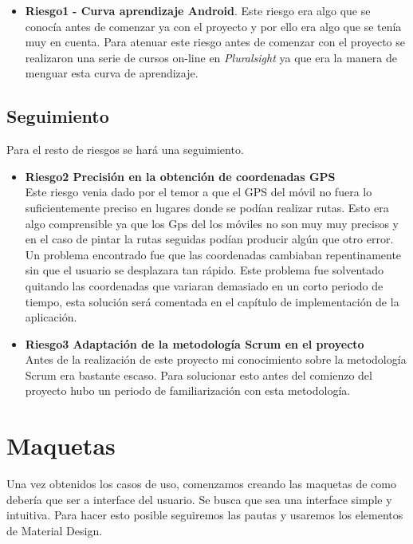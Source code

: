  

\begin{itemize}
\item \textbf{Riesgo1} \textbf{- Curva aprendizaje Android}. Este riesgo era algo que se conocía antes de comenzar ya con el proyecto y por ello era algo que se tenía  muy en cuenta. Para atenuar este riesgo antes de comenzar  con el proyecto se realizaron una serie de cursos on-line en \textit{Pluralsight} ya que era la manera de menguar esta curva de aprendizaje.






	
\end{itemize}

\subsection{Seguimiento} 	
	Para el resto de riesgos se hará una seguimiento.
	\begin{itemize}
	\item\textbf{ Riesgo2 Precisión en la obtención de coordenadas GPS}\\
	Este riesgo venia dado por el temor a que el GPS del móvil no fuera lo suficientemente preciso en  lugares donde se podían realizar rutas. Esto era algo comprensible ya que los Gps del los móviles no son muy muy precisos y en el caso de pintar la rutas seguidas podían producir algún que otro error. Un problema encontrado fue que las coordenadas cambiaban repentinamente sin que el usuario se desplazara tan rápido. Este problema fue solventado quitando las coordenadas que variaran demasiado en un corto periodo de tiempo, esta solución será comentada en el capítulo de implementación de la aplicación.


\item \textbf{Riesgo3 Adaptación de la metodología Scrum en el proyecto}\\
Antes de la realización de este proyecto mi conocimiento sobre la metodología Scrum era bastante escaso. Para solucionar esto antes del comienzo del proyecto hubo un periodo de familiarización con esta metodología. 

	\end{itemize}
\newpage
\section{Maquetas}
Una vez obtenidos los casos de uso, comenzamos creando las maquetas de como debería que ser a interface del usuario.
Se busca que sea una interface simple y intuitiva.
Para hacer esto posible seguiremos las pautas y usaremos los elementos de Material Design. 


